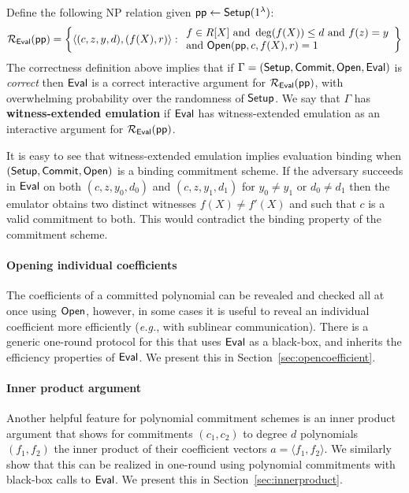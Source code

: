 Define the following NP relation given $\textsf{pp} \leftarrow \textsf{{Setup}}(1^\lambda)$: 
\[ 
\mathcal{R_\textsf{Eval}}(\textsf{pp}) = \left\{
\langle (c, z, y, d), (f(X), r) \rangle
: 
\begin{array}{l} 
f \in R[X] \ \text{and} \ \deg(f(X)) \leq d \ \text{and} \ f(z) = y \\ 
 \text{and} \ \textsf{{Open}}(\textsf{pp}, c, f(X), r) = 1 \\
\end{array}
\right\}
\] 
The correctness definition above implies that if $\Gamma = (\textsf{{Setup}}, \textsf{{Commit}}, \textsf{{Open}}, \textsf{{Eval}})$ is \emph{correct} then $\textsf{{Eval}}$ is a correct interactive argument for $\mathcal{R_\textsf{Eval}}(\textsf{pp})$, with overwhelming probability over the randomness of $\textsf{{Setup}}$. We say that $\Gamma$ has \textbf{witness-extended emulation} if $\textsf{{Eval}}$ has witness-extended emulation as an interactive argument for $\mathcal{R_\textsf{Eval}}(\textsf{pp})$. 

It is easy to see that witness-extended emulation implies evaluation binding when $(\textsf{{Setup}}, \textsf{{Commit}}, \textsf{{Open}})$ is a binding commitment scheme. If the adversary succeeds in $\textsf{{Eval}}$ on both $(c, z, y_0, d_0)$ and $(c, z, y_1, d_1)$ for $y_0 \neq y_1$ or $d_0 \neq d_1$ then the emulator obtains two distinct witnesses $f(X) \neq f'(X)$ and such that $c$ is a valid commitment to both. This would contradict the binding property of the commitment scheme. 

\paragraph{Opening individual coefficients} The coefficients of a committed polynomial can be revealed and checked all at once using $\textsf{{Open}}$, however, in some cases it is useful to reveal an individual coefficient more efficiently (\emph{e.g.}, with sublinear communication). 
There is a generic one-round protocol for this that uses $\textsf{{Eval}}$ as a black-box, and inherits the efficiency properties of $\textsf{{Eval}}$. We present this in Section~\ref{sec:opencoefficient}. 

\paragraph{Inner product argument} Another helpful feature for polynomial commitment schemes is an inner product argument that shows for commitments $(c_1, c_2)$ to degree $d$ polynomials $(f_1, f_2)$ the inner product of their coefficient vectors $a = \langle f_1, f_2 \rangle$. We similarly show that this can be realized in one-round using polynomial commitments with black-box calls to $\textsf{{Eval}}$. We present this in  Section~\ref{sec:innerproduct}. 

